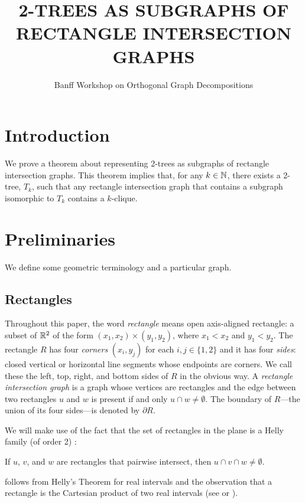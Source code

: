 \documentclass[lotsofwhite]{patmorin}
\title{\MakeUppercase{2-Trees as Subgraphs of Rectangle Intersection Graphs}}
\author{Banff Workshop on Orthogonal Graph Decompositions}
\begin{document}
\maketitle

\section{Introduction}

We prove a theorem about representing 2-trees as subgraphs of rectangle
intersection graphs. This theorem implies that, for any $k\in\mathbb{N}$, there
exists a 2-tree, $T_k$, such that any rectangle intersection graph that
contains a subgraph isomorphic to $T_k$ contains a $k$-clique.

\section{Preliminaries}

We define some geometric terminology and a particular graph.

\subsection{Rectangles}

Throughout this paper, the word \emph{rectangle} means open axis-aligned
rectangle: a subset of $\mathbb{R}^2$ of the form $(x_1,x_2)\times (y_1,y_2)$,
where $x_1<x_2$ and $y_1<y_2$.  The rectangle $R$ has four \emph{corners}
$(x_i,y_j)$ for each $i,j\in\{1,2\}$ and it has four \emph{sides}: closed
vertical or horizontal line segments whose endpoints are corners.  We call
these the left, top, right, and bottom sides of $R$ in the obvious way.
A \emph{rectangle intersection graph} is a graph whose vertices are
rectangles and the edge between two rectangles $u$ and $w$ is present
if and only $u\cap w\neq \emptyset$.  The boundary of $R$---the union
of its four sides---is denoted by $\partial R$.

We will make use of the fact that the set of rectangles in the plane is
a Helly family (of order 2) \cite[Chapter~11]{bollobas:combinatorics}:
\begin{obs}
   If $u$, $v$, and $w$ are rectangles that pairwise intersect, then
   $u\cap v\cap w\neq\emptyset$.
\end{obs}
 follows from Helly's Theorem for real intervals
and the observation that a rectangle is the Cartesian product of
two real intervals (see \cite[Page~83]{bollobas:combinatorics} or
\cite{bollobas.duchet:helly}).
\end{document}
